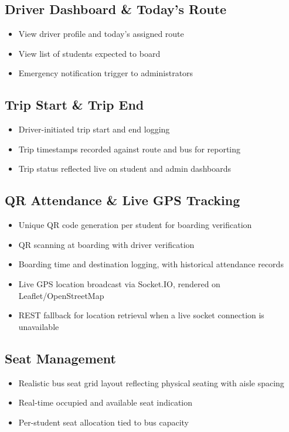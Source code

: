 \documentclass[11pt,a4paper]{report}
\begin{document}
\subsection{Driver Dashboard \& Today's Route}
\begin{itemize}[leftmargin=1.3em]
  \item View driver profile and today's assigned route
  \item View list of students expected to board
  \item Emergency notification trigger to administrators
\end{itemize}

\subsection{Trip Start \& Trip End}
\begin{itemize}[leftmargin=1.3em]
  \item Driver-initiated trip start and end logging
  \item Trip timestamps recorded against route and bus for reporting
  \item Trip status reflected live on student and admin dashboards
\end{itemize}

\subsection{QR Attendance \& Live GPS Tracking}
\begin{itemize}[leftmargin=1.3em]
  \item Unique QR code generation per student for boarding verification
  \item QR scanning at boarding with driver verification
  \item Boarding time and destination logging, with historical attendance records
  \item Live GPS location broadcast via Socket.IO, rendered on Leaflet/OpenStreetMap
  \item REST fallback for location retrieval when a live socket connection is unavailable
\end{itemize}

\subsection{Seat Management}
\begin{itemize}[leftmargin=1.3em]
  \item Realistic bus seat grid layout reflecting physical seating with aisle spacing
  \item Real-time occupied and available seat indication
  \item Per-student seat allocation tied to bus capacity
\end{itemize}
\end{document}
